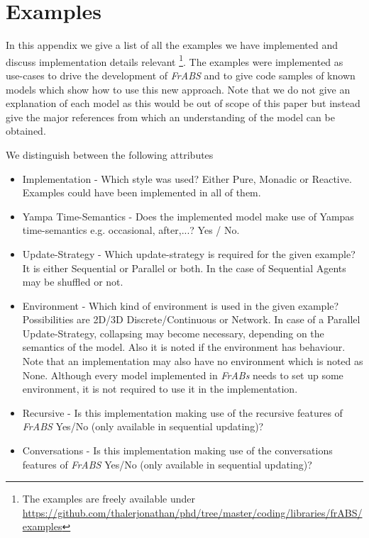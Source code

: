 \section{Examples}
In this appendix we give a list of all the examples we have implemented and discuss implementation details relevant \footnote{The examples are freely available under \url{https://github.com/thalerjonathan/phd/tree/master/coding/libraries/frABS/examples}}. The examples were implemented as use-cases to drive the development of \textit{FrABS} and to give code samples of known models which show how to use this new approach. Note that we do not give an explanation of each model as this would be out of scope of this paper but instead give the major references from which an understanding of the model can be obtained.

We distinguish between the following attributes
\begin{itemize}
	\item Implementation - Which style was used? Either Pure, Monadic or Reactive. Examples could have been implemented in all of them.
	\item Yampa Time-Semantics - Does the implemented model make use of Yampas time-semantics e.g. occasional, after,...? Yes / No.
	\item Update-Strategy - Which update-strategy is required for the given example? It is either Sequential or Parallel or both. In the case of Sequential Agents may be shuffled or not.
	\item Environment - Which kind of environment is used in the given example? Possibilities are 2D/3D Discrete/Continuous or Network. In case of a Parallel Update-Strategy, collapsing may become necessary, depending on the semantics of the model. Also it is noted if the environment has behaviour. Note that an implementation may also have no environment which is noted as None. Although every model implemented in \textit{FrABs} needs to set up some environment, it is not required to use it in the implementation.
	\item Recursive - Is this implementation making use of the recursive features of \textit{FrABS} Yes/No (only available in sequential updating)?
	\item Conversations - Is this implementation making use of the conversations features of \textit{FrABS} Yes/No (only available in sequential updating)?
\end{itemize}

